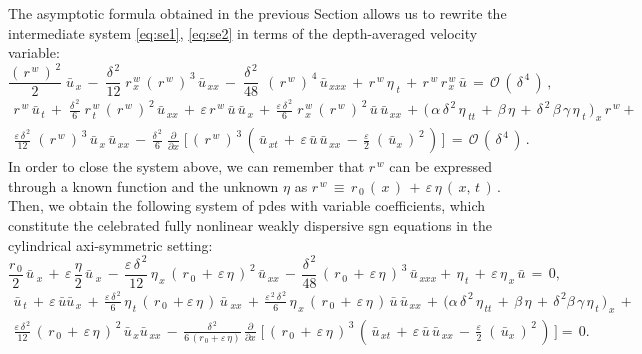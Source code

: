 \documentclass[alpha-refs, 12pt]{wiley-article}
\renewcommand{\O}{\mathcal{O}}
\newcommand{\eps}{\varepsilon}
\begin{document}
The asymptotic formula obtained in the previous Section allows us to rewrite the intermediate system \eqref{eq:se1}, \eqref{eq:se2} in terms of the depth-averaged velocity variable:
\begin{equation*}
  \frac{(\,r^{\,w}\,)^{\,2}}{2}\;\bar{u}_{\,x}\,-\;\frac{\delta^{\,2}}{12}\;r^{\,w}_{\,x}\,(\,r^{\,w}\,)^{\,3}\,\bar{u}_{\,xx}\,-\;\frac{\delta^{\,2}}{48}\;\,(\,r^{\,w}\,)^{\,4}\,\bar{u}_{\,xxx}\,+\,r^{\,w}\,\eta_{\;t}\,+\,r^{\,w}\,r^{\,w}_{\,x}\,\bar{u}\,=\,\O\,(\,\delta^{\,4}\,)\,,
\end{equation*}
\begin{multline*}
  r^{\,w}\,\bar{u}_{\,t}\,+\;\frac{\delta^{\,2}}{6}\;r^{\,w}_{\,t}\,(\,r^{\,w}\,)^{\,2}\,\bar{u}_{\,xx}\,+\,\eps\, r^{\,w}\,\bar{u}\,\bar{u}_{\,x}\,+\,\frac{\eps\,\delta^{\,2}}{6}\;r^{\,w}_{\,x}\,(\,r^{\,w}\,)^{\,2}\,\bar{u}\,\bar{u}_{\,xx}\,+\,\bigl(\,\alpha\,\delta^{\,2}\,\eta_{\;tt}\,+\,\beta\,\eta\, +\,\delta^{\,2}\,\beta\,\gamma\,\eta_{\;t}\,\bigr)_{\,x}\,r^{\,w}
   +\\
   \frac{\eps\,\delta^{\,2}}{12}\;(\,r^{\,w}\,)^{\,3}\,\bar{u}_{\,x}\,\bar{u}_{\,xx}\,-\,\frac{\delta^{\,2}}{6}\;\frac{\partial}{\partial x}\;\bigl[ \,(\,r^{\,w}\,)^{\,3}\,(\,\bar{u}_{\,xt}\,+\,\eps\,\bar{u}\,\bar{u}_{\,xx}\,-\,\frac{\eps}{2}\;(\,\bar{u}_{x}\,)^{\,2}\,)\,\bigr]\,=\,\O\,(\,\delta^{\,4}\,)\,.
\end{multline*}
In order to close the system above, we can remember that $r^{\,w}$ can be expressed through a known function and the unknown $\eta$ as $r^{\,w}\,\equiv\, r_{\,0}\,(\,x\,)\,+\,\eps\,\eta\,(\,x,\,t\,)\,$. Then, we obtain the following system of \acrshort{pde}s with variable coefficients, which constitute the celebrated fully nonlinear weakly dispersive \acrfull{sgn} equations in the cylindrical axi-symmetric setting:
\begin{equation}\label{eq:sgn1}
  \frac{r_{\,0}}{2}\,\bar{u}_{\;x} \,+\,\eps\,\frac{\eta}{2}\,\bar{u}_{\;x}\,-\,\frac{\eps\,\delta^{\,2}}{12}\,\eta_{\,x}\,(\,r_{\,0}\,+\,\eps\,\eta\,)^{\,2}\,\bar{u}_{\,xx}\,-\,\frac{\delta^{\,2}}{48}\,(\,r_{\,0}\,+\,\eps\,\eta\,)^{\,3}\,\bar{u}_{\,xxx}+\,\eta_{\,t} \,+\,\eps\,\eta_{\,x}\,\bar{u}\,=\,0,
\end{equation}
\begin{multline}\label{eq:sgn2}
  \bar{u}_{\,t}\,+\,\eps\,\bar{u}\bar{u}_{\,x}\,+\,\frac{\eps\,\delta^{\,2}}{6}\,\eta_{\,t}\,(\,r_{\,0}\,+\eps\,\eta\,)\,\bar{u}_{\;xx}\,+\,\frac{\eps^{\,2}\,\delta^{\,2}}{6}\,\eta_{\,x}\,(\,r_{\,0}\,+\,\eps\,\eta\,)\,\bar{u}\,\bar{u}_{\,xx}\,+\,\biggl(\alpha\,\delta^{\,2}\,\eta_{\,tt}\,+\,\beta\,\eta\,+\,\delta^{\,2}\beta\,\gamma\,\eta_{\,t}\,\biggr)_{\,x}\,+\\
  \frac{\eps\,\delta^{\,2}}{12}\,(\,r_{\,0}\,+\,\eps\,\eta\,)^{\,2}\,\bar{u}_{\,x}\bar{u}_{\,xx}\,-\,\frac{\delta^{\,2}}{6\,(r_{\,0}+\eps\,\eta)}\,\frac{\partial}{\partial x}\;\biggl[ \,(\,r_{\,0}\,+\,\eps\,\eta\,)^{\,3}\,(\,\bar{u}_{\,xt}\,+\,\eps\,\bar{u}\,\bar{u}_{\,xx}\,-
\,\frac{\eps}{2}\;(\,\bar{u}_{x}\,)^{\,2}\,)\,\biggr]=\,0.
\end{multline}
\end{document}
